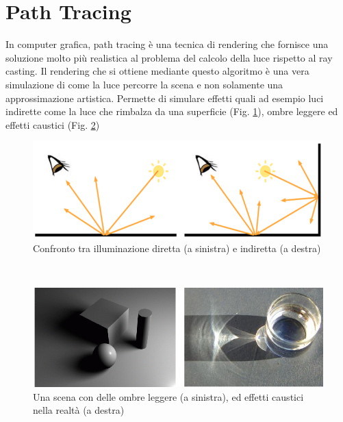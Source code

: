 \section{Path Tracing}
\label{sec:chapter_stato_arte_path_tracing}

In computer grafica, path tracing è una tecnica di rendering che fornisce una soluzione molto più realistica al problema del calcolo della luce rispetto al ray casting.
Il rendering che si ottiene mediante questo algoritmo è una vera simulazione di come la luce percorre la scena e non solamente una approssimazione artistica. Permette di simulare effetti quali ad esempio luci indirette come la luce che rimbalza da una superficie (Fig. \ref{fig:stato_arte_luci_dir_ind}), ombre leggere ed effetti caustici (Fig. \ref{fig:stato_arte_ombre_caust}) 
\\
\begin{figure}[htb]
 \centering
 \includegraphics[width=0.8\linewidth]{images/chapter_stato_arte/stato_arte_luci_dir_ind.png}\hfill
 \caption[Illuminazione diretta e indiretta]{Confronto tra illuminazione diretta (a sinistra) e indiretta (a destra)}
 \label{fig:stato_arte_luci_dir_ind}
\end{figure}
\\
\begin{figure}[htb]
 \centering
 \includegraphics[width=0.8\linewidth]{images/chapter_stato_arte/stato_arte_ombre_caust.png}\hfill
 \caption[Ombreggiature ed effetti caustici]{Una scena con delle ombre leggere (a sinistra), ed effetti caustici nella realtà (a destra)}
 \label{fig:stato_arte_ombre_caust}
\end{figure}

